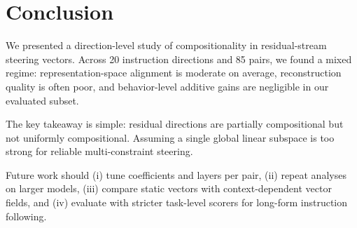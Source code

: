 \section{Conclusion}
\label{sec:conclusion}
We presented a direction-level study of compositionality in residual-stream steering vectors. Across 20 instruction directions and 85 pairs, we found a mixed regime: representation-space alignment is moderate on average, reconstruction quality is often poor, and behavior-level additive gains are negligible in our evaluated subset.

The key takeaway is simple: residual directions are partially compositional but not uniformly compositional. Assuming a single global linear subspace is too strong for reliable multi-constraint steering.

Future work should (i) tune coefficients and layers per pair, (ii) repeat analyses on larger models, (iii) compare static vectors with context-dependent vector fields, and (iv) evaluate with stricter task-level scorers for long-form instruction following.
